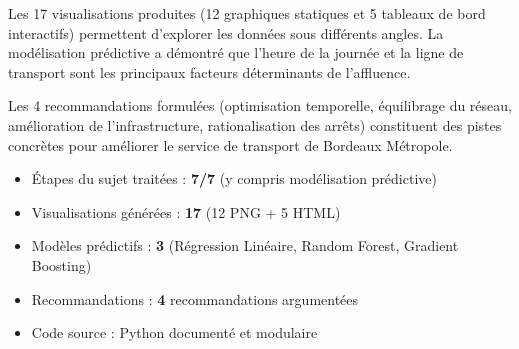 \documentclass[12pt,a4paper]{article}
\begin{document}
\vspace{0.5cm}

Les 17 visualisations produites (12 graphiques statiques et 5 tableaux de bord interactifs) permettent d'explorer les données sous différents angles. La modélisation prédictive a démontré que l'heure de la journée et la ligne de transport sont les principaux facteurs déterminants de l'affluence.

Les 4 recommandations formulées (optimisation temporelle, équilibrage du réseau, amélioration de l'infrastructure, rationalisation des arrêts) constituent des pistes concrètes pour améliorer le service de transport de Bordeaux Métropole.

\vspace{0.5cm}

\begin{infobox}
\begin{itemize}[leftmargin=0.5cm]
    \item Étapes du sujet traitées : \textbf{7/7} (y compris modélisation prédictive)
    \item Visualisations générées : \textbf{17} (12 PNG + 5 HTML)
    \item Modèles prédictifs : \textbf{3} (Régression Linéaire, Random Forest, Gradient Boosting)
    \item Recommandations : \textbf{4} recommandations argumentées
    \item Code source : Python documenté et modulaire
\end{itemize}
\end{infobox}
\end{document}
